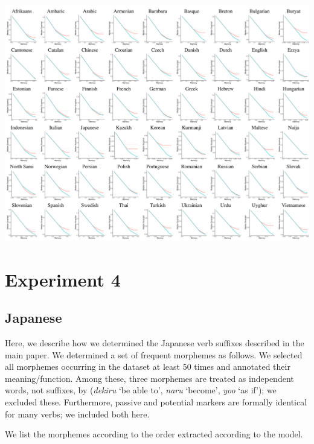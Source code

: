 \documentclass[11pt,letterpaper]{article}
\begin{document}
\begin{center}
\includegraphics[width=\textwidth]{results-table-pcfg.pdf}
\label{fig:resu-pcfg}
\end{center}




\section{Experiment 4}

\subsection{Japanese}

Here, we describe how we determined the Japanese verb suffixes described in the main paper.
We determined a set of frequent morphemes as follows.
We selected all morphemes occurring in the dataset at least 50 times and annotated their meaning/function.
Among these, three morphemes are treated as independent words, not suffixes, by \cite{kaiser2013japanese} (\textit{dekiru} `be able to', \textit{naru} `become', \textit{yoo} `as if'); we excluded these.
Furthermore, passive and potential markers are formally identical for many verbs; we included both here.

We list the morphemes according to the order extracted according to the model.
\end{document}
